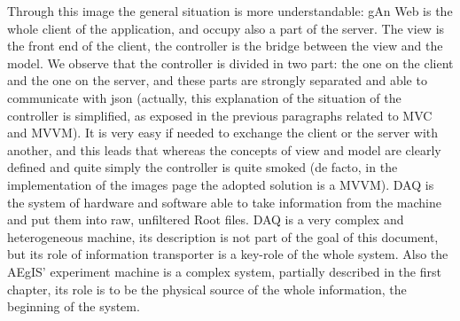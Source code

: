 Through this image the general situation is more understandable: gAn Web is the whole client of the application, and occupy also a part of the server. The view is the front end of the client, the controller is the bridge between the view and the model. We observe that the controller is divided in two part: the one on the client and the one on the server, and these parts are strongly separated and able to communicate with json (actually, this explanation of the situation of the controller is simplified, as exposed in the previous paragraphs related to MVC and MVVM). It is very easy if needed to exchange the client or the server with another, and this leads that whereas the concepts of view and model are clearly defined and quite simply the controller is quite smoked (de facto, in the implementation of the images page the adopted solution is a MVVM). DAQ is the system of hardware and software able to take information from the machine and put them into raw, unfiltered Root files. DAQ is a very complex and heterogeneous machine, its description is not part of the goal of this document, but its role of information transporter is a key-role of the whole system. Also the AEgIS' experiment machine is a complex system, partially described in the first chapter, its role is to be the physical source of the whole information, the beginning of the system.

      